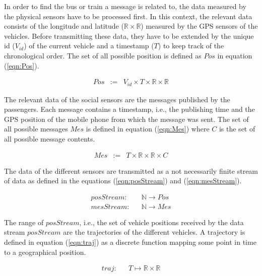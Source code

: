 In order to find the bus or train a message is related to, the data
measured by the physical sensors have to be processed first. In this
context, the relevant data consists of the longitude and latitude
($\mathbb{R} \times \mathbb{R}$) measured by the GPS sensors of the
vehicles. Before transmitting these data, they have to be extended by
the unique id ($V_{id}$) of the current vehicle and a timestamp ($T$)
to keep track of the chronological order. The set of all possible
position is defined as $Pos$ in equation (\ref{eqn:Pos}).

\vspace*{-2\baselineskip}
\begin{eqnarray}
 Pos & := & V_{id} \times T \times \mathbb{R} \times \mathbb{R}\label{eqn:Pos}
\end{eqnarray}

The relevant data of the social sensors are the messages published by
the passengers. Each message contains a timestamp, i.e., the
publishing time and the GPS position of the mobile phone from which
the message was sent. The set of all possible messages $Mes$ is
defined in equation (\ref{eqn:Mes}) where $C$ is the set of all
possible message contents.

\vspace*{-2\baselineskip}
\begin{eqnarray}
 Mes & := & T \times \mathbb{R} \times \mathbb{R} \times C\label{eqn:Mes}
\end{eqnarray}

The data of the different sensors are transmitted as a not necessarily
finite stream of data as defined in the equations
(\ref{eqn:posStream}) and (\ref{eqn:mesStream}).

\vspace*{-2\baselineskip}
\begin{eqnarray}
 posStream: &  & \mathbb{N} \rightarrow Pos\label{eqn:posStream}\\
 mesStream: &  & \mathbb{N} \rightarrow Mes\label{eqn:mesStream}
\end{eqnarray}

The range of $posStream$, i.e., the set of vehicle positions received
by the data stream $posStream$ are the trajectories of the different
vehicles. A trajectory is defined in equation (\ref{eqn:traj}) as a
discrete function mapping some point in time to a geographical
position.

\vspace*{-2\baselineskip}
\begin{eqnarray}
 traj: & & T \mapsto \mathbb{R} \times \mathbb{R}\label{eqn:traj}
\end{eqnarray}

